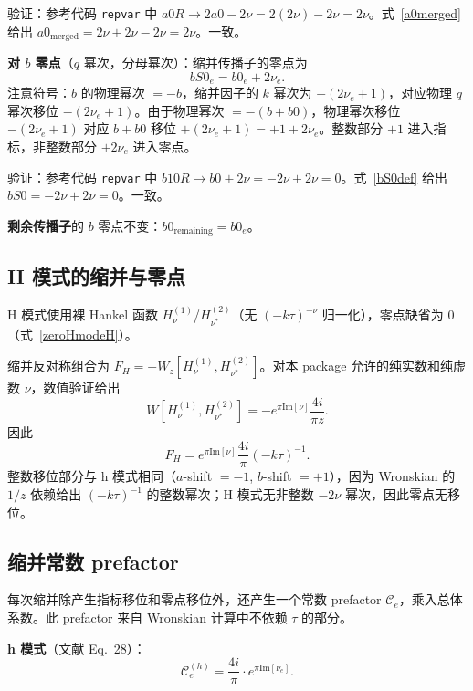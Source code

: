 ﻿\documentclass[a4paper,11pt]{article}
\begin{document}
验证：参考代码 \texttt{repvar} 中 $a0R \to 2a0 - 2\nu = 2(2\nu) - 2\nu = 2\nu$。式~\eqref{a0merged} 给出 $a0_{\text{merged}} = 2\nu + 2\nu - 2\nu = 2\nu$。一致。

\textbf{对 $b$ 零点}（$q$ 幂次，分母幂次）：缩并传播子的零点为
\begin{equation}
  bS0_e = b0_e + 2\nu_e.
  \label{bS0def}
\end{equation}
注意符号：$b$ 的物理幂次 $= -b$，缩并因子的 $k$ 幂次为 $-(2\nu_e+1)$，对应物理 $q$ 幂次移位 $-(2\nu_e+1)$。由于物理幂次 $= -(b + b0)$，物理幂次移位 $-(2\nu_e+1)$ 对应 $b+b0$ 移位 $+(2\nu_e+1) = +1 + 2\nu_e$。整数部分 $+1$ 进入指标，非整数部分 $+2\nu_e$ 进入零点。

验证：参考代码 \texttt{repvar} 中 $b10R \to b0 + 2\nu = -2\nu + 2\nu = 0$。式~\eqref{bS0def} 给出 $bS0 = -2\nu + 2\nu = 0$。一致。

\textbf{剩余传播子}的 $b$ 零点不变：$b0_{\text{remaining}} = b0_e$。

\subsection{H 模式的缩并与零点}

H 模式使用裸 Hankel 函数 $H_\nu^{(1)}$/$H_{\nu^*}^{(2)}$（无 $(-k\tau)^{-\nu}$ 归一化），零点缺省为 0（式~\eqref{zeroHmodeH}）。

缩并反对称组合为 $F_H=-W_z[H_\nu^{(1)},H_{\nu^*}^{(2)}]$。对本 package 允许的纯实数和纯虚数 $\nu$，数值验证给出
\begin{equation}
  W[H_\nu^{(1)}, H_{\nu^*}^{(2)}] = -e^{\pi\text{Im}[\nu]} \frac{4i}{\pi z}.
\end{equation}
因此
\begin{equation}
  F_H = e^{\pi\text{Im}[\nu]} \frac{4i}{\pi}(-k\tau)^{-1}.
\end{equation}
整数移位部分与 h 模式相同（$a$-shift $= -1$, $b$-shift $= +1$），因为 Wronskian 的 $1/z$ 依赖给出 $(-k\tau)^{-1}$ 的整数幂次；H 模式无非整数 $-2\nu$ 幂次，因此零点无移位。

\subsection{缩并常数 prefactor}

每次缩并除产生指标移位和零点移位外，还产生一个常数 prefactor $\mathcal{C}_e$，乘入总体系数。此 prefactor 来自 Wronskian 计算中不依赖 $\tau$ 的部分。

\textbf{h 模式}（文献 Eq.~28）：
\begin{equation}
  \mathcal{C}_e^{(h)} = \frac{4i}{\pi} \cdot e^{\pi \text{Im}[\nu_e]}.
  \label{prefactorH}
\end{equation}
\end{document}
